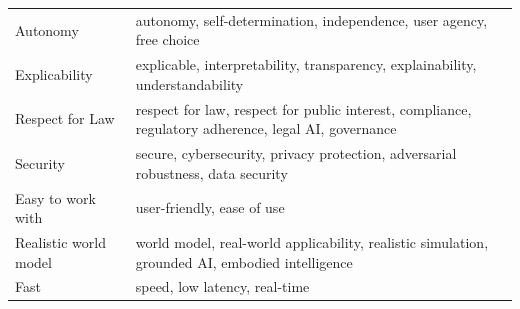 \documentclass{article}
\begin{document}
\begin{longtable}{|p{5cm}|p{10cm}|}
    Autonomy & autonomy, self-determination, independence, user agency, free choice \\ 
    Explicability & explicable, interpretability, transparency, explainability, understandability \\ 
    Respect for Law & respect for law, respect for public interest, compliance, regulatory adherence, legal AI, governance \\ 
    Security & secure, cybersecurity, privacy protection, adversarial robustness, data security \\ 
    Easy to work with & user-friendly, ease of use \\ 
    Realistic world model & world model, real-world applicability, realistic simulation, grounded AI, embodied intelligence \\ 
    Fast & speed, low latency, real-time \\ 
    \hline
\end{longtable}
\end{document}
